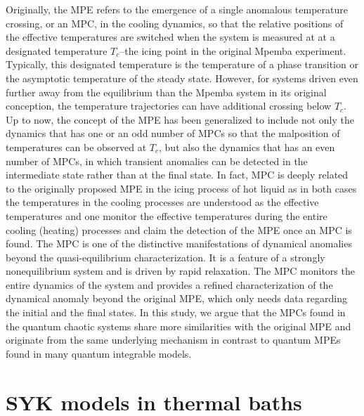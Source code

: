 Originally, the MPE refers to the emergence of a single anomalous temperature crossing, or an MPC, in the cooling dynamics, so that the relative positions of the effective temperatures are switched when the system is measured at at a designated temperature $T_c$--the icing point in the original Mpemba experiment. Typically, this designated temperature is the temperature of a phase transition or the asymptotic temperature of the steady state. However, for systems driven even further away from the equilibrium than the Mpemba system in its original conception, the temperature trajectories can have additional crossing below $T_c$. Up to now, the concept of the MPE has been generalized to include not only the dynamics that has one or an odd number of MPCs so that the malposition of temperatures can be observed at $T_c$, but also the dynamics that has an even number of MPCs, in which transient anomalies can be detected in the intermediate state rather than at the final state. In fact, MPC is deeply related to the originally proposed MPE in the icing process of hot liquid as in both cases the temperatures in the cooling processes are understood as the effective temperatures and one monitor the effective temperatures during the entire cooling (heating) processes and claim the detection of the MPE once an MPC is found. The MPC is one of the distinctive manifestations of dynamical anomalies beyond the quasi-equilibrium characterization. It is a feature of a strongly nonequilibrium system and is driven by rapid relaxation. The MPC monitors the entire dynamics of the system and provides a refined characterization of the dynamical anomaly beyond the original MPE, which only needs data regarding the initial and the final states. In this study, we argue that the MPCs found in the quantum chaotic systems share more similarities with the original MPE and originate from the same underlying mechanism in contrast to quantum MPEs found in many quantum integrable models. %



\section{SYK models in thermal baths}
